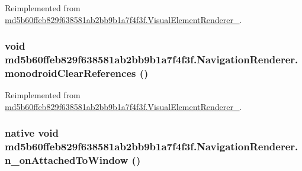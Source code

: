 Reimplemented from \hyperlink{classmd5b60ffeb829f638581ab2bb9b1a7f4f3f_1_1_visual_element_renderer__1_321b2967faff34b0f7971f55915f583e}{md5b60ffeb829f638581ab2bb9b1a7f4f3f.VisualElementRenderer\_}.\hypertarget{classmd5b60ffeb829f638581ab2bb9b1a7f4f3f_1_1_navigation_renderer_475bdc366c4f2909604d6e217dba8235}{
\subsubsection[{monodroidClearReferences}]{\setlength{\rightskip}{0pt plus 5cm}void md5b60ffeb829f638581ab2bb9b1a7f4f3f.NavigationRenderer.monodroidClearReferences ()}}
\label{classmd5b60ffeb829f638581ab2bb9b1a7f4f3f_1_1_navigation_renderer_475bdc366c4f2909604d6e217dba8235}




Reimplemented from \hyperlink{classmd5b60ffeb829f638581ab2bb9b1a7f4f3f_1_1_visual_element_renderer__1_4a1c180026d8eab71549e47b7de4b9b8}{md5b60ffeb829f638581ab2bb9b1a7f4f3f.VisualElementRenderer\_}.\hypertarget{classmd5b60ffeb829f638581ab2bb9b1a7f4f3f_1_1_navigation_renderer_77794e91c573098800a84c804674bdd5}{
\subsubsection[{n\_\-onAttachedToWindow}]{\setlength{\rightskip}{0pt plus 5cm}native void md5b60ffeb829f638581ab2bb9b1a7f4f3f.NavigationRenderer.n\_\-onAttachedToWindow ()}}
\label{classmd5b60ffeb829f638581ab2bb9b1a7f4f3f_1_1_navigation_renderer_77794e91c573098800a84c804674bdd5}


